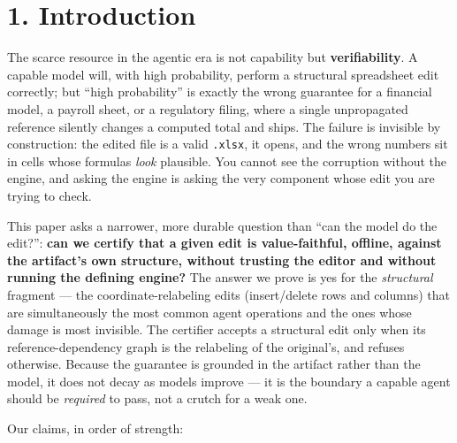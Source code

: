 \documentclass[
  11pt,
]{article}
\begin{document}
\section{1. Introduction}\label{introduction}

The scarce resource in the agentic era is not capability but
\textbf{verifiability}. A capable model will, with high probability,
perform a structural spreadsheet edit correctly; but ``high
probability'' is exactly the wrong guarantee for a financial model, a
payroll sheet, or a regulatory filing, where a single unpropagated
reference silently changes a computed total and ships. The failure is
invisible by construction: the edited file is a valid \texttt{.xlsx}, it
opens, and the wrong numbers sit in cells whose formulas \emph{look}
plausible. You cannot see the corruption without the engine, and asking
the engine is asking the very component whose edit you are trying to
check.

This paper asks a narrower, more durable question than ``can the model
do the edit?'': \textbf{can we certify that a given edit is
value-faithful, offline, against the artifact's own structure, without
trusting the editor and without running the defining engine?} The answer
we prove is yes for the \emph{structural} fragment --- the
coordinate-relabeling edits (insert/delete rows and columns) that are
simultaneously the most common agent operations and the ones whose
damage is most invisible. The certifier accepts a structural edit only
when its reference-dependency graph is the relabeling of the original's,
and refuses otherwise. Because the guarantee is grounded in the artifact
rather than the model, it does not decay as models improve --- it is the
boundary a capable agent should be \emph{required} to pass, not a crutch
for a weak one.

Our claims, in order of strength:
\end{document}
